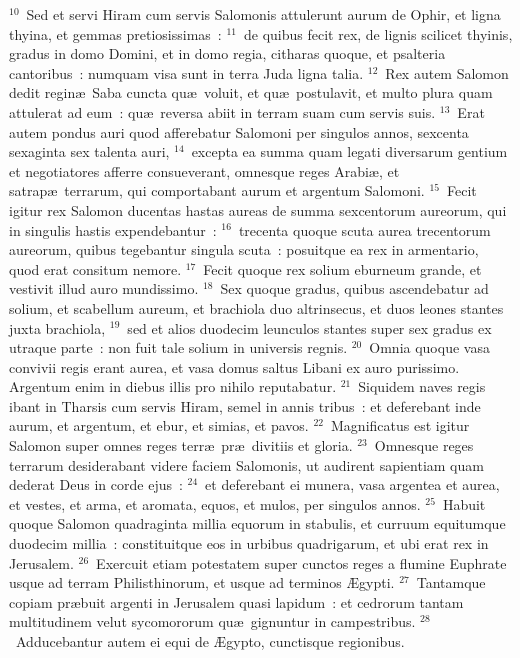 ${}^{10}$~Sed et servi Hiram cum servis Salomonis attulerunt aurum de Ophir, et ligna thyina, et gemmas pretiosissimas~:
${}^{11}$~de quibus fecit rex, de lignis scilicet thyinis, gradus in domo Domini, et in domo regia, citharas quoque, et psalteria cantoribus~: numquam visa sunt in terra Juda ligna talia.
${}^{12}$~Rex autem Salomon dedit regin\ae\ Saba cuncta qu\ae\ voluit, et qu\ae\ postulavit, et multo plura quam attulerat ad eum~: qu\ae\ reversa abiit in terram suam cum servis suis.
${}^{13}$~Erat autem pondus auri quod afferebatur Salomoni per singulos annos, sexcenta sexaginta sex talenta auri,
${}^{14}$~excepta ea summa quam legati diversarum gentium et negotiatores afferre consueverant, omnesque reges Arabi\ae , et satrap\ae\ terrarum, qui comportabant aurum et argentum Salomoni.
${}^{15}$~Fecit igitur rex Salomon ducentas hastas aureas de summa sexcentorum aureorum, qui in singulis hastis expendebantur~:
${}^{16}$~trecenta quoque scuta aurea trecentorum aureorum, quibus tegebantur singula scuta~: posuitque ea rex in armentario, quod erat consitum nemore.
${}^{17}$~Fecit quoque rex solium eburneum grande, et vestivit illud auro mundissimo.
${}^{18}$~Sex quoque gradus, quibus ascendebatur ad solium, et scabellum aureum, et brachiola duo altrinsecus, et duos leones stantes juxta brachiola,
${}^{19}$~sed et alios duodecim leunculos stantes super sex gradus ex utraque parte~: non fuit tale solium in universis regnis.
${}^{20}$~Omnia quoque vasa convivii regis erant aurea, et vasa domus saltus Libani ex auro purissimo. Argentum enim in diebus illis pro nihilo reputabatur.
${}^{21}$~Siquidem naves regis ibant in Tharsis cum servis Hiram, semel in annis tribus~: et deferebant inde aurum, et argentum, et ebur, et simias, et pavos.
${}^{22}$~Magnificatus est igitur Salomon super omnes reges terr\ae\ pr\ae\ divitiis et gloria.
${}^{23}$~Omnesque reges terrarum desiderabant videre faciem Salomonis, ut audirent sapientiam quam dederat Deus in corde ejus~:
${}^{24}$~et deferebant ei munera, vasa argentea et aurea, et vestes, et arma, et aromata, equos, et mulos, per singulos annos.
${}^{25}$~Habuit quoque Salomon quadraginta millia equorum in stabulis, et curruum equitumque duodecim millia~: constituitque eos in urbibus quadrigarum, et ubi erat rex in Jerusalem.
${}^{26}$~Exercuit etiam potestatem super cunctos reges a flumine Euphrate usque ad terram Philisthinorum, et usque ad terminos \AE gypti.
${}^{27}$~Tantamque copiam pr\ae buit argenti in Jerusalem quasi lapidum~: et cedrorum tantam multitudinem velut sycomororum qu\ae\ gignuntur in campestribus.
${}^{28}$~Adducebantur autem ei equi de \AE gypto, cunctisque regionibus.


